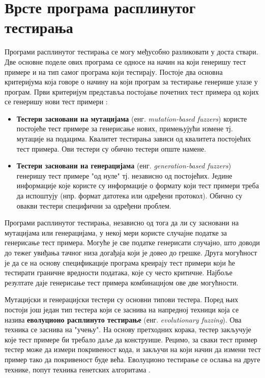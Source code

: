\documentclass[12pt,oneside]{memoir}
\begin{document}
\section{Врсте програма расплинутог тестирања}
\label{subsec:metode}

Програми расплинутог тестирања се могу међусобно разликовати у доста ствари. Две основне поделе ових програма се односе на начин на који генеришу тест примере и на тип самог програма који тестирају.
Постоје два основна критеријума која говоре о начину на који програм за тестирање генерише улазе у програм.
Први критеријум представља постојање почетних тест примера од којих се генеришу нови тест примери \cite{fuzzingBrute, fuzzing}:
\begin{itemize}
\item \textbf{Тестери засновани на мутацијама} (енг. \textit{mutation-based fuzzers}) користе постојеће тест примере за генерисање нових, примењујући измене тј. мутације на подацима. Квалитет тестирања зависи од квалитета постојећих тест примера. Ови тестери су обично тестери опште намене. 
\item \textbf{Тестери засновани на генерацијама} (енг. \textit{generation-based fuzzers}) генеришу тест примере "од нуле" тј. независно од постојећих. Једине информације које користе су информације о формату који тест примери треба да испоштују (нпр. формат датотека или одређени протокол). Обично су овакви тестери специфични за одређени проблем.
\end{itemize}

Програми расплинутог тестирања, независно од тога да ли су засновани на мутацијама или генерацијама, у некој мери користе случајне податке за генерисање тест примера. Могуће је све податке генерисати случајно, што доводи до тежег увиђања тачног низа догађаја који је довео до грешке. Друга могућност је да се на основу спецификације програма креирају тест примери који ће тестирати граничне вредности података, које су често критичне. Најбоље резултате даје генерисање тест примера комбинацијом ове две могућности.

Мутацијски и генерацијски тестери су основни типови тестера. Поред њих постоји још један тип тестера који се заснива на напредној техници која се назива \textbf{еволуционо расплинуто тестирање} (енг. \textit{evolutionary fuzzing}). Ова техника се заснива на "учењу". На основу претходних корака, тестер закључује које тест примере би требало даље да конструише. Рецимо, за сваки тест пример тестер може да измери покривеност кода, и закључи на који начин да измени тест пример тако да покривеност буде већа. Еволуционо тестирање се ослања на друге технике, попут техника генетских алгоритама \cite{fuzzing, 15minuteGuide}.
\end{document}
